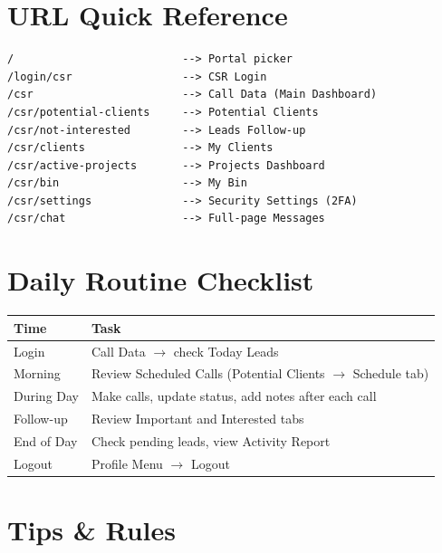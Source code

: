 \documentclass[11pt,a4paper]{article}
\begin{document}
\section{URL Quick Reference}

\begin{lstlisting}
/                          --> Portal picker
/login/csr                 --> CSR Login
/csr                       --> Call Data (Main Dashboard)
/csr/potential-clients     --> Potential Clients
/csr/not-interested        --> Leads Follow-up
/csr/clients               --> My Clients
/csr/active-projects       --> Projects Dashboard
/csr/bin                   --> My Bin
/csr/settings              --> Security Settings (2FA)
/csr/chat                  --> Full-page Messages
\end{lstlisting}

\section{Daily Routine Checklist}

\begin{longtable}{@{}p{3cm}p{11cm}@{}}
\toprule
\textbf{Time} & \textbf{Task} \\
\midrule
Login       & Call Data $\rightarrow$ check Today Leads \\
Morning     & Review Scheduled Calls (Potential Clients $\rightarrow$ Schedule tab) \\
During Day  & Make calls, update status, add notes after each call \\
Follow-up   & Review Important and Interested tabs \\
End of Day  & Check pending leads, view Activity Report \\
Logout      & Profile Menu $\rightarrow$ Logout \\
\bottomrule
\end{longtable}


\section{Tips \& Rules}
\end{document}
